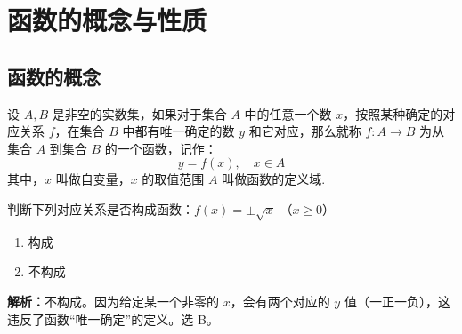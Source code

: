 \chapter{函数的概念与性质}

\section{函数的概念}

\begin{definition}[函数]
设 $A, B$ 是非空的实数集，如果对于集合 $A$ 中的任意一个数 $x$，按照某种确定的对应关系 $f$，在集合 $B$ 中都有唯一确定的数 $y$ 和它对应，那么就称 $f: A \to B$ 为从集合 $A$ 到集合 $B$ 的一个函数，记作：
\[ y = f(x), \quad x \in A \]
其中，$x$ 叫做自变量，$x$ 的取值范围 $A$ 叫做函数的定义域.
\end{definition}

\begin{exercise}
判断下列对应关系是否构成函数：$f(x) = \pm\sqrt{x}$ （$x \ge 0$）\selectbracket
\begin{enumerate}
    \item[A.] 构成
    \item[B.] 不构成
\end{enumerate}
\end{exercise}

\textbf{解析：}不构成。因为给定某一个非零的 $x$，会有两个对应的 $y$ 值（一正一负），这违反了函数“唯一确定”的定义。选 B。
